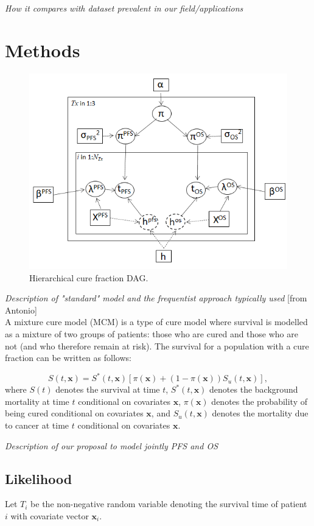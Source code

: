 \documentclass[AMA,STIX1COL]{WileyNJD-v2}
\begin{document}
{\it How it compares with dataset prevalent in our field/applications}


\section{Methods}\label{sec:methods}

\begin{figure}
\centering
\includegraphics[width=0.6\linewidth]{DAG_with_Tx.png}
\caption{\label{fig:hier_dag} Hierarchical cure fraction DAG.}
\end{figure}


{\it Description of "standard" model and the frequentist approach typically used}
[from Antonio]\\
A mixture cure model (MCM) is a type of cure model where survival is modelled as a mixture of two groups of patients: those who are cured and those who are not (and who therefore remain at risk). The survival for a population with a cure fraction can be written as follows:

\begin{equation*}
S(t,\bm{x}) = S^{*}(t, \bm{x}) [\pi(\bm{x}) + (1 - \pi(\bm{x})) S_u(t, \bm{x})],
\end{equation*}
where $S(t)$ denotes the survival at time $t$, $S^*(t,\bm{x})$ denotes the background mortality
at time $t$ conditional on covariates $\bm{x}$, $\pi(\bm{x})$ denotes the probability of being
cured conditional on covariates $\bm{x}$, and $S_{u}(t,\bm{x})$ denotes the mortality due to 
cancer at time $t$ conditional on covariates $\bm{x}$.




{\it Description of our proposal to model jointly PFS and OS}

\subsection{Likelihood}
Let $T_i$ be the non-negative random variable denoting the survival time
of patient $i$ with covariate vector $\boldsymbol{x}_i$.
\end{document}
